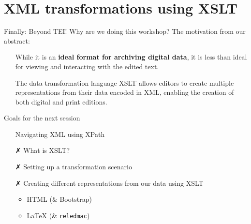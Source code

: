 \section{XML transformations using XSLT}

\begin{frame}{Finally: Beyond TEI!}
    Why are we doing this workshop? The motivation from our abstract:
    \begin{itemize}
        \item[\textcolor{w3schools}{\faHandORight}] While it is an \textbf{ideal format for archiving digital data}, it is \alert{less than ideal for viewing and interacting with the edited text.}
        \item[\textcolor{w3schools}{\faHandORight}] The data transformation language XSLT allows editors to create multiple representations from their data encoded in XML, enabling the creation of both digital and print editions. 
    \end{itemize}
    
    \begin{block}{Goals for the next session}
    \begin{enumerate}
        \item[\textcolor{w3schools}{\faHandORight}] Navigating XML using XPath
        \item[\textcolor{alert}{\faClose}] What is XSLT?
        \item[\textcolor{alert}{\faClose}] Setting up a transformation scenario
        \item[\textcolor{alert}{\faClose}] Creating different representations from our data using XSLT
        \begin{itemize}
            \item HTML (\& Bootstrap)
            \item \LaTeX{} (\& \texttt{reledmac})
        \end{itemize}
    \end{enumerate}

    \end{block}
\end{frame}


